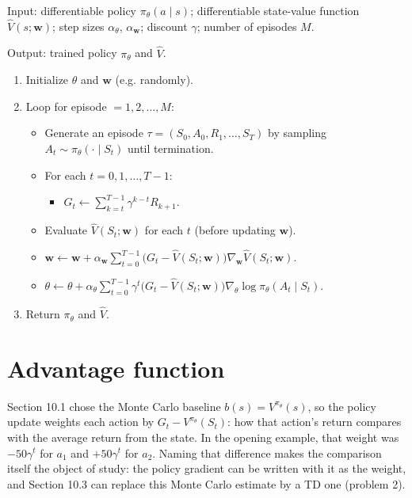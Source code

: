 \begin{implnote}
Input: differentiable policy $\pi_\theta(a\mid s)$; differentiable state-value function $\hat{V}(s;\mathbf{w})$; step sizes $\alpha_\theta$, $\alpha_{\mathbf{w}}$; discount $\gamma$; number of episodes $M$.

Output: trained policy $\pi_\theta$ and $\hat{V}$.

\begin{enumerate}
\item Initialize $\theta$ and $\mathbf{w}$ (e.g. randomly).
\item Loop for episode $=1,2,\ldots,M$:
\begin{itemize}
\item Generate an episode $\tau=(S_0,A_0,R_1,\ldots,S_T)$ by sampling $A_t\sim\pi_\theta(\cdot\mid S_t)$ until termination.
\item For each $t=0,1,\ldots,T-1$:
\begin{itemize}
\item $G_t\leftarrow\sum_{k=t}^{T-1}\gamma^{k-t}R_{k+1}$.
\end{itemize}
\item Evaluate $\hat{V}(S_t;\mathbf{w})$ for each $t$ (before updating $\mathbf{w}$).
\item $\mathbf{w}\leftarrow\mathbf{w}+\alpha_{\mathbf{w}}\sum_{t=0}^{T-1}\bigl(G_t-\hat{V}(S_t;\mathbf{w})\bigr)\nabla_{\mathbf{w}}\hat{V}(S_t;\mathbf{w})$.
\item $\theta\leftarrow\theta+\alpha_\theta\sum_{t=0}^{T-1}\gamma^{t}\bigl(G_t-\hat{V}(S_t;\mathbf{w})\bigr)\nabla_\theta\log\pi_\theta(A_t\mid S_t)$.
\end{itemize}
\item Return $\pi_\theta$ and $\hat{V}$.
\end{enumerate}

\end{implnote}




\section{Advantage function}

Section 10.1 chose the Monte Carlo baseline $b(s)=V^{\pi_\theta}(s)$, so the policy update weights each action by $G_t-V^{\pi_\theta}(S_t)$: how that action's return compares with the average return from the state. In the opening example, that weight was $-50\gamma^t$ for $a_1$ and $+50\gamma^t$ for $a_2$. Naming that difference makes the comparison itself the object of study: the policy gradient can be written with it as the weight, and Section 10.3 can replace this Monte Carlo estimate by a TD one (problem 2).

